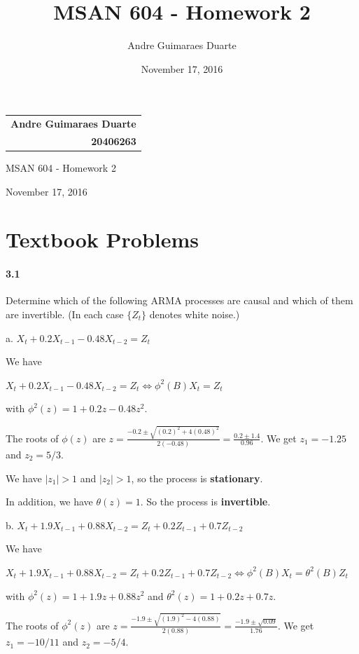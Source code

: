 \documentclass[]{article}
\title{MSAN 604 - Homework 2}
\author{Andre Guimaraes Duarte}
\date{November 17, 2016}
\let\oldparagraph\paragraph
\renewcommand{\paragraph}[1]{\oldparagraph{#1}\mbox{}}
\begin{document}
\null\hfill\begin{tabular}[t]{r@{}}
  \textbf{\LARGE Andre Guimaraes Duarte} \\
  \textbf{\Large 20406263}
\end{tabular}

\begin{center}
\Huge
MSAN 604 - Homework 2

\Large
November 17, 2016

\normalsize
\end{center}

\section{Textbook Problems}
\paragraph{3.1}
Determine which of the following ARMA processes are causal and which of
them are invertible. (In each case $\{Z_t\}$ denotes white noise.)

a. $X_t + 0.2 X_{t-1} - 0.48 X_{t-2} = Z_t$

\color{blue}
We have 

$X_t + 0.2 X_{t-1} - 0.48 X_{t-2} = Z_t \Leftrightarrow \phi^2(B)X_t = Z_t$

with $\phi^2(z) = 1 + 0.2 z - 0.48 z^2$.

The roots of $\phi(z)$ are $z = \frac{-0.2 \pm \sqrt{(0.2)^2 + 4(0.48)^2}}{2(-0.48)} = \frac{0.2 \pm 1.4}{0.96}$. We get $z_1 = -1.25$ and $z_2 = 5/3$.

We have $|z_1| > 1$ and $|z_2| > 1$, so the process is \textbf{stationary}.

In addition, we have $\theta (z) = 1$. So the process is \textbf{invertible}.
\color{black}

b. $X_t + 1.9 X_{t-1} + 0.88 X_{t-2} = Z_t + 0.2 Z_{t-1} + 0.7 Z_{t-2}$

\color{blue}
We have

$X_t + 1.9 X_{t-1} + 0.88 X_{t-2} = Z_t + 0.2 Z_{t-1} + 0.7 Z_{t-2} \Leftrightarrow \phi^2(B)X_t = \theta^2(B)Z_t$

with $\phi^2(z) = 1 + 1.9 z + 0.88 z^2$ and $\theta^2(z) = 1 + 0.2 z + 0.7 z$.

The roots of $\phi^2(z)$ are $z = \frac{-1.9 \pm \sqrt{(1.9)^2 - 4(0.88)}}{2(0.88)} = \frac{-1.9 \pm \sqrt{0.09}}{1.76}$. We get $z_1 = -10/11$ and $z_2 = -5/4$.
\end{document}
